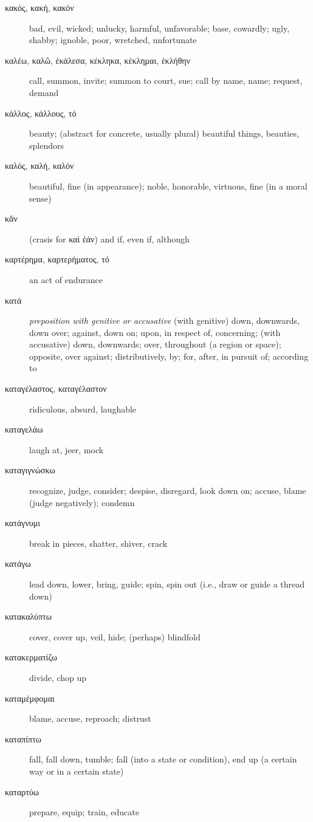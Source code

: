 \documentclass[12pt,letterpaper]{article}
\begin{document}
\begin{description}
    \item[\textgreek{κακός, κακή, κακόν}] \marginnote{*}bad, evil, wicked; unlucky, harmful, unfavorable; base, cowardly; ugly, shabby; ignoble, poor, wretched, unfortunate
    \item[\textgreek{καλέω, καλῶ, ἐκάλεσα, κέκληκα, κέκλημαι, ἐκλήθην}] \marginnote{*}call, summon, invite; summon to court, sue; call by name, name; request, demand
    \item[\textgreek{κάλλος, κάλλους, τό}] beauty; (abstract for concrete, usually plural) beautiful things, beauties, splendors
    \item[\textgreek{καλός, καλή, καλόν}] \marginnote{*}beautiful, fine (in appearance); noble, honorable, virtuous, fine (in a moral sense)
    \item[\textgreek{κἄν}] \marginnote{*}(crasis for καὶ ἐάν) and if, even if, although
    \item[\textgreek{καρτέρημα, καρτερήματος, τό}] an act of endurance
    \item[\textgreek{κατά}] \marginnote{*}\textit{preposition with genitive or accusative} (with genitive) down, downwards, down over; against, down on; upon, in respect of, concerning; (with accusative) down, downwards; over, throughout (a region or space); opposite, over against; distributively, by; for, after, in pursuit of; according to
    \item[\textgreek{καταγέλαστος, καταγέλαστον}] ridiculous, absurd, laughable
    \item[\textgreek{καταγελάω}] laugh at, jeer, mock
    \item[\textgreek{καταγιγνώσκω}] recognize, judge, consider; despise, disregard, look down on; accuse, blame (judge negatively); condemn
    \item[\textgreek{κατάγνυμι}] break in pieces, shatter, shiver, crack
    \item[\textgreek{κατάγω}] lead down, lower, bring, guide; spin, spin out (i.e., draw or guide a thread down)
    \item[\textgreek{κατακαλύπτω}] cover, cover up, veil, hide; (perhaps) blindfold
    \item[\textgreek{κατακερματίζω}] divide, chop up
    \item[\textgreek{καταμέμφομαι}] blame, accuse, reproach; distrust
    \item[\textgreek{καταπίπτω}] fall, fall down, tumble; fall (into a state or condition), end up (a certain way or in a certain state)
    \item[\textgreek{καταρτύω}] prepare, equip; train, educate

\end{description}
\end{document}
